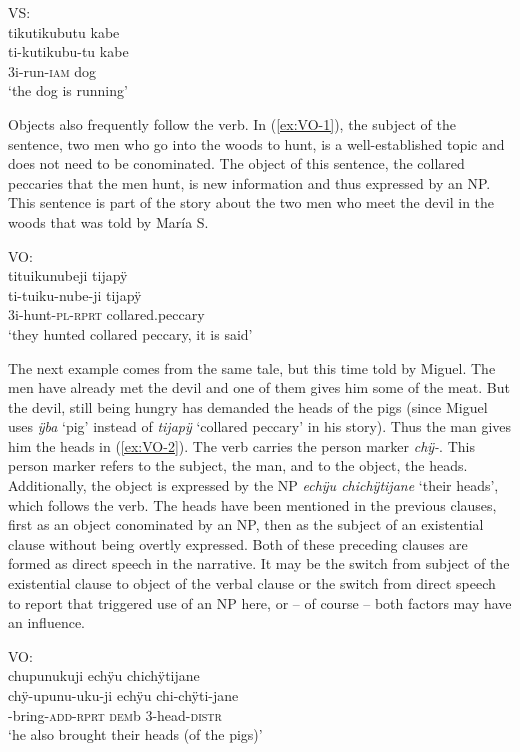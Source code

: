 \ea\label{ex:SUBJ-follow}
\begingl 
\glpreamble \textup{VS:}\\tikutikubutu kabe\\
\gla ti-kutikubu-tu kabe\\ 
\glb 3i-run-\textsc{iam} dog\\ 
\glft ‘the dog is running’
\trailingcitation{[jxx-a120516l-a.146]}
\xe

Objects also frequently follow the verb. In (\ref{ex:VO-1}), the subject of the sentence, two men who go into the woods to hunt, is a well-established topic and does not need to be conominated. The object of this sentence, the collared peccaries that the men hunt, is new information and thus expressed by an NP. This sentence is part of the story about the two men who meet the devil in the woods that was told by María S.

\ea\label{ex:VO-1}
\begingl
\glpreamble \textup{VO:}\\tituikunubeji tijapÿ\\
\gla ti-tuiku-nube-ji tijapÿ\\
\glb 3i-hunt-\textsc{pl}-\textsc{rprt} collared.peccary\\
\glft ‘they hunted collared peccary, it is said’
\endgl
\trailingcitation{[rxx-n120511l-2.17]}
\xe

The next example comes from the same tale, but this time told by Miguel. The men have already met the devil and one of them gives him some of the meat. But the devil, still being hungry has demanded the heads of the pigs (since Miguel uses \textit{ÿba} ‘pig’ instead of \textit{tijapÿ} ‘collared peccary’ in his story). Thus the man gives him the heads in (\ref{ex:VO-2}). The verb carries the person marker \textit{chÿ-}. This person marker refers to the subject, the man, and to the object, the heads. Additionally, the object is expressed by the NP \textit{echÿu chichÿtijane} ‘their heads’, which follows the verb. The heads have been mentioned in the previous clauses, first as an object conominated by an NP, then as the subject of an existential clause without being overtly expressed. Both of these preceding clauses are formed as direct speech in the narrative. It may be the switch from subject of the existential clause to object of the verbal clause or the switch from direct speech to report that triggered use of an NP here, or – of course – both factors may have an influence.


\ea\label{ex:VO-2}
\begingl
\glpreamble \textup{VO:}\\chupunukuji echÿu chichÿtijane\\
\gla chÿ-upunu-uku-ji echÿu chi-chÿti-jane\\
-bring-\textsc{add}-\textsc{rprt} \textsc{dem}b 3-head-\textsc{distr}\\
\glft ‘he also brought their heads (of the pigs)’
\endgl
\trailingcitation{[mxx-n101017s-1.050]}
\xe

